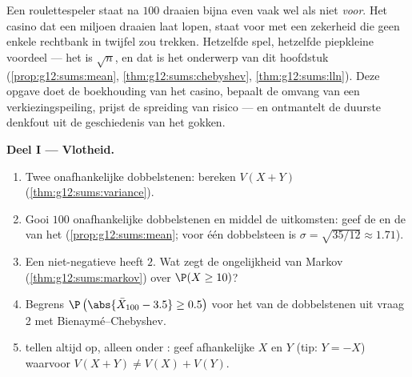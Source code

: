 \begin{problem}
\label{pb:g12:sums:1}
Een roulettespeler staat na $100$ draaien bijna even vaak wel als niet
\emph{voor}. Het casino dat een miljoen draaien laat lopen, staat voor met een
zekerheid die geen enkele rechtbank in twijfel zou trekken. Hetzelfde spel,
hetzelfde piepkleine voordeel --- het  is $\sqrt n$, en dat is het
onderwerp van dit hoofdstuk (\cref{prop:g12:sums:mean},
\cref{thm:g12:sums:chebyshev}, \cref{thm:g12:sums:lln}). Deze opgave doet de
boekhouding van het casino, bepaalt de omvang van een verkiezingspeiling,
prijst de spreiding van risico --- en ontmantelt de duurste denkfout uit de
geschiedenis van het gokken.

\medskip
\noindent\textbf{Deel I --- Vlotheid.}
\begin{enumerate}
  \item Twee onafhankelijke dobbelstenen: bereken $V(X + Y)$
        (\cref{thm:g12:sums:variance}).
  \item Gooi $100$ onafhankelijke dobbelstenen en middel de uitkomsten: geef
        de  en de  van het
         (\cref{prop:g12:sums:mean}; voor één dobbelsteen
        is $\sigma = \sqrt{35/12} \approx 1.71$).
  \item Een niet-negatieve  heeft  $2$. Wat
        zegt de ongelijkheid van Markov (\cref{thm:g12:sums:markov}) over
        $\P(X \geq 10)$?
  \item Begrens $\P\left(\abs{\bar X_{100} - 3.5} \geq 0.5\right)$ voor het
         van de dobbelstenen uit vraag 2 met
        Bienaymé--Chebyshev.
  \item {} tellen altijd op,  alleen onder
        : geef afhankelijke $X$ en $Y$ (tip: $Y = -X$)
        waarvoor $V(X + Y) \neq V(X) + V(Y)$.
\end{enumerate}


\end{problem}
